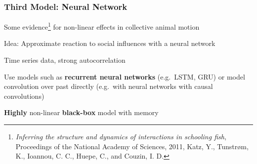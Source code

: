\documentclass{beamer}
\begin{document}
\begin{frame}
  \frametitle{Third Model: Neural Network}
  Some evidence\footnote{\textit{Inferring the structure and dynamics of interactions in schooling fish}, Proceedings of the National Academy of Sciences, 2011, Katz, Y., Tunstrøm, K., Ioannou, C. C., Huepe, C., and Couzin, I. D.} for non-linear effects in collective animal motion

  Idea: Approximate reaction to social influences with a neural network

  Time series data, strong autocorrelation

  Use models such as \textbf{recurrent neural networks} (e.g.\ LSTM, GRU) or model convolution over past directly (e.g.\ with neural networks with causal convolutions)
  
  \textbf{Highly} non-linear \textbf{black-box} model with memory
\end{frame}
\end{document}
